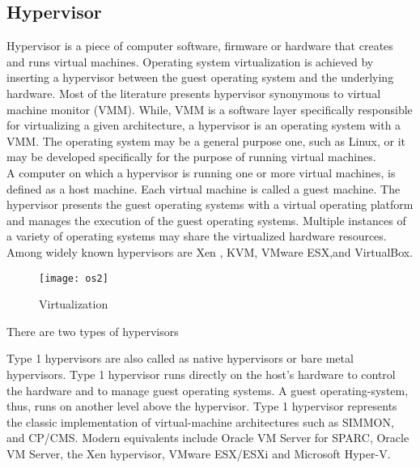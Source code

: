 \subsection{Hypervisor}

Hypervisor is a piece of computer software, firmware or hardware that creates and runs virtual machines. Operating system virtualization is achieved by inserting a hypervisor between the guest operating system and the underlying hardware. Most of the literature presents hypervisor synonymous to virtual machine monitor (VMM). While, VMM is a software layer specifically responsible for virtualizing a given architecture, a hypervisor is an operating system with a VMM. The operating system may be a general purpose one, such as Linux, or it may be developed specifically for the purpose of running virtual machines\cite{Agesen:2010:EXV:1899928.1899930}.
\\
A computer on which a hypervisor is running one or more virtual machines, is defined as a host machine. Each virtual machine is called a guest machine. The hypervisor presents the guest operating systems with a virtual operating platform and manages the execution of the guest operating systems. Multiple instances of a variety of operating systems may share the virtualized hardware resources. Among widely known hypervisors are Xen \cite{Barham:2003:XAV:1165389.945462, Chisnall:2007:DGX:1407351}, KVM\cite{Habib:2008:VK:1344209.1344217, kivity07kvm}, VMware ESX\cite{Agesen:2010:EXV:1899928.1899930},and VirtualBox\cite{citeulike:3149886}.
\\
\begin{figure}[!ht]
\centering
\texttt{[image: os2]}
\caption{Virtualization}
\label{fig:Virtualization}
\end{figure}
There are two types of hypervisors \cite{Goldberg:1973:AVM:800122.803950}
\begin{description}
\item Type 1 hypervisors are also called as native hypervisors or bare metal hypervisors. Type 1 hypervisor runs directly on the host's hardware to control the hardware and to manage guest operating systems. A guest operating-system, thus, runs on another level above the hypervisor. Type 1 hypervisor represents the classic implementation of virtual-machine architectures such as SIMMON, and CP/CMS. Modern equivalents include Oracle VM Server for SPARC, Oracle VM Server, the Xen hypervisor\cite{Barham:2003:XAV:1165389.945462}, VMware ESX/ESXi\cite{Agesen:2010:EXV:1899928.1899930} and Microsoft Hyper-V.
\end{description}
